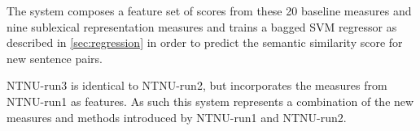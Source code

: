 The system composes a feature set of scores from these 20 baseline measures and nine sublexical representation measures and trains a bagged SVM regressor as described in \ref{sec:regression} in order to predict the semantic similarity score for new sentence pairs.

NTNU-run3 is identical to NTNU-run2, but incorporates the measures from NTNU-run1 as features. As such this system represents a combination of the new measures and methods introduced by NTNU-run1 and NTNU-run2.

